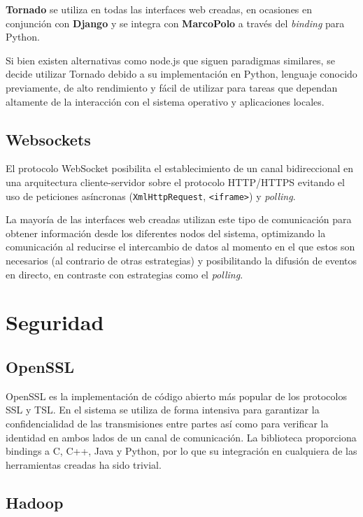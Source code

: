 \textbf{Tornado} se utiliza en todas las interfaces web creadas, en ocasiones en conjunción con \textbf{Django} y se integra con \textbf{MarcoPolo} a través del \textit{binding} para Python.

Si bien existen alternativas como node.js que siguen paradigmas similares, se decide utilizar Tornado debido a su implementación en Python, lenguaje conocido previamente, de alto rendimiento y fácil de utilizar para tareas que dependan altamente de la interacción con el sistema operativo y aplicaciones locales.

\subsection{Websockets}

El protocolo WebSocket \cite{rfc6455} posibilita el establecimiento de un canal bidireccional en una arquitectura cliente-servidor sobre el protocolo HTTP/HTTPS evitando el uso de peticiones asíncronas (\texttt{XmlHttpRequest}, \texttt{<iframe>}) y \textit{polling}.

La mayoría de las interfaces web creadas utilizan este tipo de comunicación para obtener información desde los diferentes nodos del sistema, optimizando la comunicación al reducirse el intercambio de datos al momento en el que estos son necesarios (al contrario de otras estrategias) y posibilitando la difusión de eventos en directo, en contraste con estrategias como el \textit{polling}.

\section{Seguridad}

\subsection{OpenSSL}

OpenSSL es la implementación de código abierto más popular de los protocolos SSL y TSL. En el sistema se utiliza de forma intensiva para garantizar la confidencialidad de las transmisiones entre partes así como para verificar la identidad en ambos lados de un canal de comunicación. La biblioteca proporciona bindings a C, C++, Java y Python, por lo que su integración en cualquiera de las herramientas creadas ha sido trivial. 

\subsection{Hadoop}

